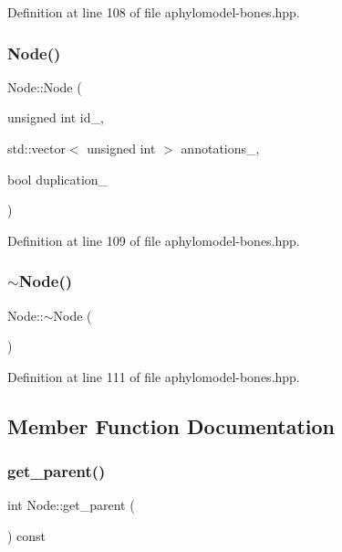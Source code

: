 Definition at line 108 of file aphylomodel-\/bones.\+hpp.

\mbox{\label{class_node_a05edab5d06fba5a71443399343645553}} 
\subsubsection{\texorpdfstring{Node()}{Node()}\hspace{0.1cm}{\footnotesize\ttfamily [3/3]}}
{\footnotesize\ttfamily Node\+::\+Node (\begin{DoxyParamCaption}\item[{unsigned int}]{id\+\_\+,  }\item[{std\+::vector$<$ unsigned int $>$}]{annotations\+\_\+,  }\item[{bool}]{duplication\+\_\+ }\end{DoxyParamCaption})\hspace{0.3cm}{\ttfamily [inline]}}



Definition at line 109 of file aphylomodel-\/bones.\+hpp.

\mbox{\label{class_node_aa0840c3cb5c7159be6d992adecd2097c}} 
\subsubsection{\texorpdfstring{$\sim$\+Node()}{~Node()}}
{\footnotesize\ttfamily Node\+::$\sim$\+Node (\begin{DoxyParamCaption}{ }\end{DoxyParamCaption})\hspace{0.3cm}{\ttfamily [inline]}}



Definition at line 111 of file aphylomodel-\/bones.\+hpp.



\subsection{Member Function Documentation}
\mbox{\label{class_node_a661cb63a33e950b84c9c093c63d1ab63}} 
\subsubsection{\texorpdfstring{get\+\_\+parent()}{get\_parent()}}
{\footnotesize\ttfamily int Node\+::get\+\_\+parent (\begin{DoxyParamCaption}{ }\end{DoxyParamCaption}) const\hspace{0.3cm}{\ttfamily [inline]}}



